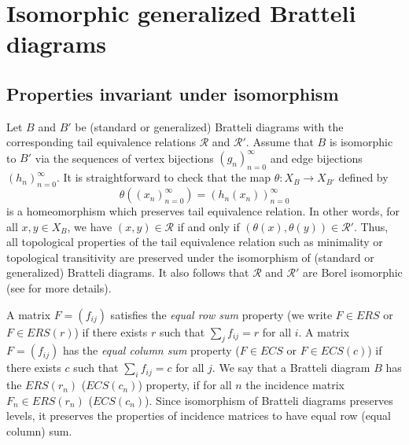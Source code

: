\documentclass[11pt, twoside]{amsart}
\theoremstyle{definition}
\theoremstyle{remark}
\theoremstyle{plain}
\numberwithin{equation}{section}
\begin{document}
    
    
  





\section{Isomorphic generalized Bratteli diagrams}\label{sec:mainres}


\subsection{Properties invariant under isomorphism}

Let $B$ and $B'$ be (standard or generalized) Bratteli diagrams with the corresponding tail equivalence relations $\mathcal{R}$ and $\mathcal{R}'$.
Assume that $B$ is isomorphic to $B'$ via the sequences of vertex bijections $(g_n)_{n = 0}^{\infty}$ and edge bijections $(h_n)_{n = 0}^{\infty}$. It is straightforward to check that the map $\theta: X_B \rightarrow X_{B'}$ defined by $$\theta((x_n)_{n = 0}^{\infty}) = (h_n(x_n))_{n = 0}^{\infty}$$ is a homeomorphism which preserves tail equivalence relation. In other words, for all $x,y \in X_B$, we have $(x,y) \in \mathcal{R}$ if and only if $(\theta(x), \theta(y)) \in \mathcal{R}'$. Thus, all topological properties of the tail equivalence relation such as minimality or topological transitivity 
are preserved under the isomorphism of (standard or generalized) Bratteli diagrams. It also follows that $\mathcal{R}$ and $\mathcal{R}'$ are Borel isomorphic (see \cite{Kechris2024} for more details).

A matrix $F = (f_{ij})$ satisfies the \textit{equal row sum} property (we write $F\in ERS$ or $F\in ERS(r)$) if there exists $r$ such that $\sum_{j} f_{ij} = r$ for all $i$. A matrix $F = (f_{ij})$ has the {\em equal column sum} property ($F \in ECS$ or $F\in ECS(c)$) if there exists $c$ such that $\sum_{i} f_{ij} = c$ for all $j$. We say that a Bratteli diagram $B$ has the $ERS(r_n)$ ($ECS(c_n)$) property, if for all $n$ the incidence matrix $F_n \in ERS(r_n)$ ($ECS(c_n)$). Since isomorphism of Bratteli diagrams preserves levels, it preserves the properties of incidence matrices to have equal row (equal column) sum.
\end{document}
